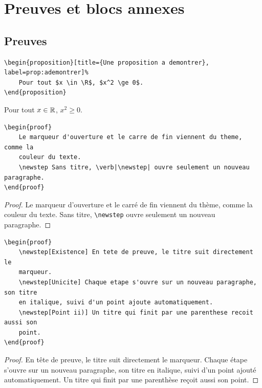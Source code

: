 
\lstset{language=[LaTeX]TeX}

\chapter{Preuves et blocs annexes}%
\label{chap:blocks}
\minitoc%

\section{Preuves}%
\label{sec:proofs}

\begin{lstlisting}
\begin{proposition}[title={Une proposition a demontrer}, label=prop:ademontrer]%
    Pour tout $x \in \R$, $x^2 \ge 0$.
\end{proposition}
\end{lstlisting}
\begin{proposition}[title={Une proposition à démontrer}, label=prop:ademontrer]%
    Pour tout $x \in \mathbb{R}$, $x^2 \ge 0$.
\end{proposition}

\begin{lstlisting}
\begin{proof}
    Le marqueur d'ouverture et le carre de fin viennent du theme, comme la
    couleur du texte.
    \newstep Sans titre, \verb|\newstep| ouvre seulement un nouveau paragraphe.
\end{proof}
\end{lstlisting}
\begin{proof}
    Le marqueur d'ouverture et le carré de fin viennent du thème, comme la
    couleur du texte.
    \newstep Sans titre, \verb|\newstep| ouvre seulement un nouveau paragraphe.
\end{proof}

\begin{lstlisting}
\begin{proof}
    \newstep[Existence] En tete de preuve, le titre suit directement le
    marqueur.
    \newstep[Unicite] Chaque etape s'ouvre sur un nouveau paragraphe, son titre
    en italique, suivi d'un point ajoute automatiquement.
    \newstep[Point ii)] Un titre qui finit par une parenthese recoit aussi son
    point.
\end{proof}
\end{lstlisting}
\begin{proof}
    \newstep[Existence] En tête de preuve, le titre suit directement le
    marqueur.
    \newstep[Unicité] Chaque étape s'ouvre sur un nouveau paragraphe, son titre
    en italique, suivi d'un point ajouté automatiquement.
    \newstep[Point ii)] Un titre qui finit par une parenthèse reçoit aussi son
    point.
\end{proof}


